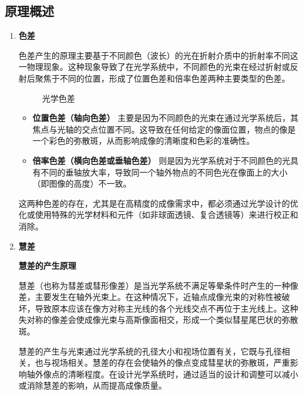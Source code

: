 \documentclass[dvipsnames, svgnames,a4paper,11pt]{article}
\begin{document}
	\subsection{原理概述}
	\begin{enumerate}
		\item \textbf{色差}
		
		色差产生的原理主要基于不同颜色（波长）的光在折射介质中的折射率不同这一物理现象。这种现象导致了在光学系统中，不同颜色的光束在经过折射或反射后聚焦于不同的位置，形成了位置色差和倍率色差两种主要类型的色差。
		
		\begin{figure}[htbp]
			\centering
			\caption{光学色差}
			\label{fig:fig2}			
		\end{figure}
		
		\begin{itemize}
			\item \textbf{位置色差（轴向色差）} 主要是因为不同颜色的光束在通过光学系统后，其焦点与光轴的交点位置不同。这导致在任何给定的像面位置，物点的像是一个彩色的弥散斑，从而影响成像的清晰度和色彩的准确性。
			
			\item \textbf{倍率色差（横向色差或垂轴色差）} 则是因为光学系统对于不同颜色的光具有不同的垂轴放大率，导致同一个轴外物点的不同色光在像面上的大小（即图像的高度）不一致。
		\end{itemize}
		
		这两种色差的存在，尤其是在高精度的成像需求中，都必须通过光学设计的优化或使用特殊的光学材料和元件（如非球面透镜、复合透镜等）来进行校正和消除。		
		
		\item \textbf{慧差}
		
		\textbf{慧差的产生原理}
		
		慧差（也称为彗差或彗形像差）是当光学系统不满足等晕条件时产生的一种像差，主要发生在轴外光束上。在这种情况下，近轴点成像光束的对称性被破坏，导致原本应该在像方对称主光线的各个光线交点不再位于主光线上。这种失对称的像差会使成像光束与高斯像面相交，形成一个类似彗星尾巴状的弥散斑。
		
		慧差的产生与光束通过光学系统的孔径大小和视场位置有关，它既与孔径相关，也与视场相关。慧差的存在会使轴外的像点变成彗星状的弥散斑，严重影响轴外像点的清晰程度。在设计光学系统时，通过适当的设计和调整可以减小或消除慧差的影响，从而提高成像质量。
		

\end{enumerate}
\end{document}
